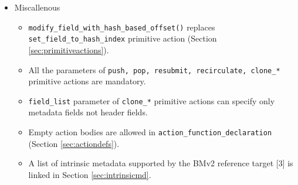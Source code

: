 \documentclass[12pt]{article}
\begin{document}
\begin{itemize}
\item Miscallenous 
  \begin{itemize}
  \item \texttt{modify_field_with_hash_based_offset()} replaces \texttt{set_field_to_hash_index} primitive action (Section \ref{sec:primitiveactions}).
  \item All the parameters of \texttt{push, pop, resubmit, recirculate, clone_*} primitive actions are mandatory.
  \item \texttt{field_list} parameter of \texttt{clone_*} primitive actions can specify only metadata fields not header fields.
  \item Empty action bodies are allowed in \texttt{action_function_declaration} (Section \ref{sec:actiondefs}).
  \item A list of intrinsic metadata supported by the BMv2 reference target [3] is linked in Section \ref{sec:intrinsicmd}.
  \end{itemize}

\end{itemize}



\end{document}
